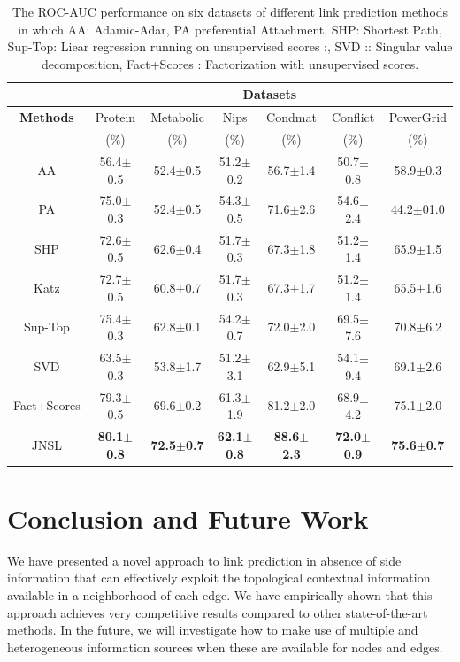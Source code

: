 \documentclass[runningheads,a4paper]{llncs}
\begin{document}
\begin{table}
\caption{The ROC-AUC performance on six datasets of different link prediction methods in which AA: Adamic-Adar, PA \cite{pa} preferential Attachment, SHP: Shortest Path, Sup-Top: Liear regression running on unsupervised scores \cite{matrix-factorization}:, SVD \cite{matrix-factorization}:: Singular value decomposition, Fact+Scores \cite{matrix-factorization}: Factorization with unsupervised scores. }
\centering
\setlength{\tabcolsep}{1mm}
\begin{tabular}{|c|c|c|c|c|c|c|}

\hline
         & \multicolumn{6}{c|}{\textbf{Datasets}}\\
 \hline
\textbf{Methods} & Protein & Metabolic & Nips & Condmat & Conflict & PowerGrid\\
	& ($\%$) & ($\%$) & ($\%$) & ($\%$) & ($\%$) & ($\%$)\\
\hline
AA & 56.4$\pm$0.5 & 52.4$\pm$0.5 & 51.2$\pm$0.2 & 56.7$\pm$1.4 & 50.7$\pm$0.8 & 58.9$\pm$0.3\\
PA & 75.0$\pm$0.3 & 52.4$\pm$0.5 & 54.3$\pm$0.5 & 71.6$\pm$2.6 & 54.6$\pm$2.4 & 44.2$\pm$01.0\\
SHP & 72.6$\pm$0.5 & 62.6$\pm$0.4 & 51.7$\pm$0.3 & 67.3$\pm$1.8 & 51.2$\pm$1.4 & 65.9$\pm$1.5\\
Katz & 72.7$\pm$0.5 & 60.8$\pm$0.7 & 51.7$\pm$0.3 & 67.3$\pm$1.7 & 51.2$\pm$1.4 & 65.5$\pm$1.6 \\
Sup-Top & 75.4$\pm$0.3 & 62.8$\pm$0.1 & 54.2$\pm$0.7 & 72.0$\pm$2.0 & 69.5$\pm$7.6 & 70.8$\pm$6.2\\
SVD & 63.5$\pm$0.3 & 53.8$\pm$1.7 & 51.2$\pm$3.1 & 62.9$\pm$5.1 & 54.1$\pm$9.4 & 69.1$\pm$2.6\\
Fact+Scores & 79.3$\pm$0.5 & 69.6$\pm$0.2 & 61.3$\pm$1.9 & 81.2$\pm$2.0 & 68.9$\pm$4.2 & 75.1$\pm$2.0 \\
JNSL & \textbf{80.1$\pm$0.8} & \textbf{72.5$\pm$0.7} & \textbf{62.1$\pm$0.8} & \textbf{88.6$\pm$2.3} & \textbf{72.0$\pm$0.9} & \textbf{75.6$\pm$0.7} \\
 \hline 
\end{tabular}
\label{result_table}
\end{table}

\section{Conclusion and Future Work}
We have presented a novel approach to link prediction in absence of side information that can effectively exploit the topological contextual information available in a neighborhood of each edge. We have empirically shown that this approach achieves very competitive results compared to other state-of-the-art methods.
In the future, we will investigate how to make use of multiple and heterogeneous information sources when these are available for nodes and edges.
\end{document}
